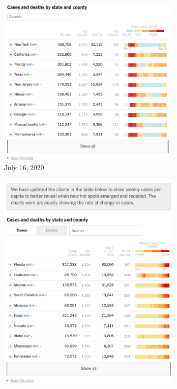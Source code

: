 \documentclass[article]{jdssv}\usepackage[]{graphicx}\usepackage[]{xcolor}
\begin{document}
\begin{figure}
\begin{subfigure}[t]{.25\textwidth}
\includegraphics[width=\textwidth]{nyt-wayback-20200716}
\caption{July 16, 2020}\label{fig:nyt-colors2}
\end{subfigure}\hfill
\begin{subfigure}[t]{.25\textwidth}
\includegraphics[width=\textwidth]{nyt-wayback-20200718}

\end{subfigure}
\end{figure}
\end{document}
